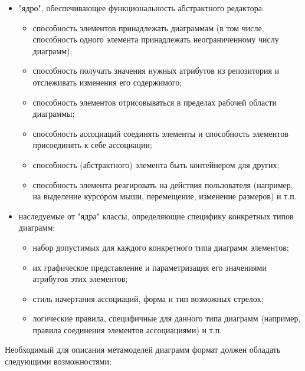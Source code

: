 \documentclass[a5paper]{article}
\begin{document}
\begin{itemize}
  \item "ядро", обеспечивающее функциональность абстрактного редактора:
    \begin{itemize}
      \item способность элементов принадлежать диаграммам (в том числе, способность
            одного элемента принадлежать неограниченному числу диаграмм);
          \item способность получать значения нужных атрибутов из репозитория и
            отслеживать изменения его содержимого;
          \item способность элементов отрисовываться в пределах рабочей области
            диаграммы;
          \item способность ассоциаций соединять элементы и способность элементов
            присоединять к себе ассоциации;
          \item способность (абстрактного) элемента быть контейнером для других;
          \item способность элемента реагировать на действия пользователя (например, на
            выделение курсором мыши, перемещение, изменение размеров) и т.п.
    \end{itemize}
  \item наследуемые от "ядра" классы, определяющие специфику конкретных типов
        диаграмм:
        \begin{itemize}
          \item набор допустимых для каждого конкретного типа диаграмм элементов;
          \item их графическое представление и параметризация его значениями атрибутов
                этих элементов;
          \item стиль начертания ассоциаций, форма и тип возможных стрелок;
          \item логические правила, специфичные для данного типа диаграмм (например,
                правила соединения элементов ассоциациями) и т.п.
        \end{itemize}
\end{itemize}

Необходимый для описания метамоделей диаграмм формат должен обладать
следующими возможностями:
\end{document}
